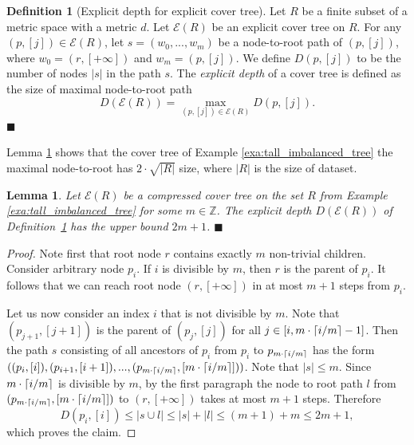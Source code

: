 \documentclass{vgtc}                          %
\numberwithin{algocf}{section}
\theoremstyle{definition}
\newtheorem{dfn}[algocf]{Definition}
\theoremstyle{definition}
\theoremstyle{definition}
\theoremstyle{plain}
\newtheorem{lem}[algocf]{Lemma}
\DeclarePairedDelimiter\ceil{\lceil}{\rceil}
\newcommand{\Child}{\mathrm{Children}}
\newcommand{\Z}{\mathbb{Z}}
\newcommand{\T}{\mathcal{E}}
\newcommand{\bs}{\hfill $\blacksquare$}
\begin{document}
\begin{dfn}[Explicit depth for explicit cover tree]
	\label{dfn:explicit_depth_for_compressed_cover_tree}
	Let $R$ be a finite subset of a metric space with a metric $d$.
	Let $\T(R)$ be an explicit cover tree on $R$. 
	For any $(p,[j]) \in \T(R)$, let $s = (w_0, ... , w_m)$ be a node-to-root path of $(p,[j])$, where
	$w_0 = (r, [+\infty])$ and $w_m = (p,[j])$. We define $D(p, [j])$ to be the number of nodes $|s|$ in the path $s$. The \emph{explicit depth} of a cover tree is defined as the size of maximal node-to-root path $$ D(\T(R)) = \max_{(p,[j]) \in \T(R)}D(p,[j]).$$
	\bs
\end{dfn}

\noindent
Lemma \ref{lem:tall_imbalanced_tree_explicit_depth} shows that the cover tree of Example \ref{exa:tall_imbalanced_tree} the maximal node-to-root has $2 \cdot \sqrt{|R|}$ size, where $|R|$ is the size of dataset. 

\begin{lem}
	\label{lem:tall_imbalanced_tree_explicit_depth}
	Let $\T(R)$ be a compressed cover tree on the set $R$ from Example \ref{exa:tall_imbalanced_tree} for some $m \in \Z$. 
    The explicit depth $D(\T(R))$ of Definition~\ref{dfn:explicit_depth_for_compressed_cover_tree} has the upper bound $2m+1$. 
	\bs
\end{lem}
\begin{proof}
    Note first that root node $r$ contains exactly $m$ non-trivial children.
    Consider arbitrary node $p_i$.
    If $i$ is divisible by $m$, then $r$ is the parent of $p_i$. It follows that we can reach root node $(r,[+\infty])$ in at most $m+1$ steps from $p_i$. 
	
	\medskip
	
	\noindent
	Let us now consider an index $i$ that is not divisible by $m$. 
	Note that  $(p_{j+1}, [j+1])$ is the parent of $(p_j,[j])$ for all $j \in [i, m \cdot \ceil{i / m} - 1]$.  
	Then the path $s$ consisting of all ancestors of $p_i$ from $p_i$ to $p_{m \cdot \ceil{i / m}}$ has the form $((p_{i},[i]), (p_{i+1},[i+1]), ..., (p_{m \cdot \ceil{i / m}}, [m \cdot \ceil{i / m} ] ))$. 
	Note that $|s| \leq m$. Since $ m \cdot \ceil{i / m}$ is divisible by $m$, by the first paragraph the node to root path $l$ from $ (p_{m \cdot \ceil{i / m}}, [m \cdot \ceil{i / m} ] )$ to $(r,[+\infty])$ takes at most $m+1$ steps.
	Therefore $$D(p_i, [i]) \leq |s \cup l| \leq |s| + |l| \leq (m + 1) + m \leq 2m+1,$$
	which proves the claim.
\end{proof}
\end{document}
